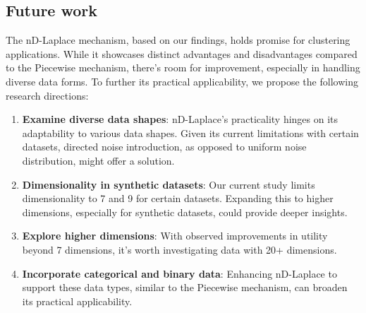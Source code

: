 \subsection{Future work}
The nD-Laplace mechanism, based on our findings, holds promise for clustering applications. While it showcases distinct advantages and disadvantages compared to the Piecewise mechanism, there's room for improvement, especially in handling diverse data forms. To further its practical applicability, we propose the following research directions:

\begin{enumerate}
\item \textbf{Examine diverse data shapes}: nD-Laplace's practicality hinges on its adaptability to various data shapes. Given its current limitations with certain datasets, directed noise introduction, as opposed to uniform noise distribution, might offer a solution.
\item \textbf{Dimensionality in synthetic datasets}: Our current study limits dimensionality to 7 and 9 for certain datasets. Expanding this to higher dimensions, especially for synthetic datasets, could provide deeper insights.
\item \textbf{Explore higher dimensions}: With observed improvements in utility beyond 7 dimensions, it's worth investigating data with 20+ dimensions.
\item \textbf{Incorporate categorical and binary data}: Enhancing nD-Laplace to support these data types, similar to the Piecewise mechanism, can broaden its practical applicability. 
\end{enumerate}

